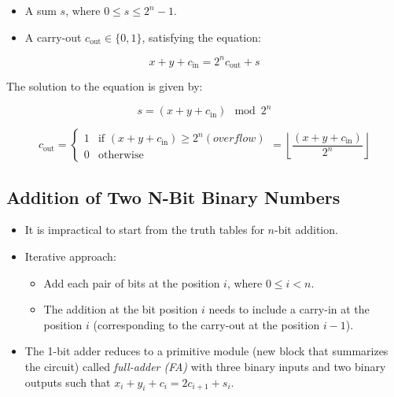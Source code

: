 \documentclass[12pt,openany, tikz,border=10pt]{book}
\begin{document}
			      	\begin{itemize}
			      		\item[] A sum $s$, where $0 \leq s \leq 2^n - 1$.
			      		\item[] A carry-out $c_{\text{out}} \in \{0, 1\}$, satisfying the equation:
			      	\end{itemize}
			      	
			      	\begin{equation}
			      		x + y + c_{\text{in}} = 2^n c_{\text{out}} + s
			      	\end{equation}
			      	
			      	The solution to the equation is given by:
			      	
			      	\begin{equation}
			      		s = (x + y + c_{\text{in}}) \mod 2^n
			      	\end{equation}
			      	
			      	\begin{equation}
			      		c_{\text{out}} = 
			      		\begin{cases} 
			      			1 & \text{if } (x + y + c_{\text{in}}) \geq 2^n (overflow) \\
			      			0 & \text{otherwise}                                       
			      		\end{cases}
			      		= \left\lfloor \frac{(x + y + c_{\text{in}})}{2^n} \right\rfloor
			      	\end{equation}
			      	\subsection{Addition of Two N-Bit Binary Numbers}
			      	
			      	\begin{itemize}
			      		\item[] It is impractical to start from the truth tables for \( n \)-bit addition.
			      		\item[] Iterative approach:
			      		      \begin{itemize}
			      		      	\item[] Add each pair of bits at the position \( i \), where \( 0 \leq i < n \).
			      		      	\item[] The addition at the bit position \( i \) needs to include a carry-in at the position \( i \) (corresponding to the carry-out at the position \( i - 1 \)).
			      		      \end{itemize}
			      		\item[] The 1-bit adder reduces to a primitive module (new block that summarizes the circuit) called \textit{full-adder (FA)} with three binary inputs and two binary outputs such that \newline \( x_i + y_i + c_i = 2c_{i+1} + s_i \).
			      	\end{itemize}
			      	\newpage
\end{document}
